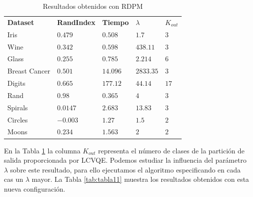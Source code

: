 \begin{table}[!h]
	\centering
	\setlength{\arrayrulewidth}{1mm}
	\setlength{\tabcolsep}{10pt}
	\renewcommand{\arraystretch}{0.85}
	
	\begin{tabular}{ >{\centering\arraybackslash}m{2.5cm}  >{\centering\arraybackslash}m{1.8cm}>{\centering\arraybackslash}m{1.5cm}>{\centering\arraybackslash}m{1cm}>{\centering\arraybackslash}m{1cm}}
		\hline
		\rowcolor{black}
		\multicolumn{5}{c}{\bf \color{white}{Resultados obtenidos con RDPM}}\\
		\hline
		\rowcolor{gray!50}
		\textbf{Dataset} & \textbf{RandIndex} & \textbf{Tiempo} & \textbf{$\lambda$} & \textbf{$K_{out}$}  \\
		Iris & $0.479$ & $0.508$ & $1.7$ & $3$ \\
		Wine & $0.342$ & $0.598$ & $438.11$ & $3$ \\
		Glass & $0.255$ & $0.785$ & $2.214$ & $6$ \\
		Breast Cancer & $0.501$ & $14.096$ & $2833.35$ & $3$ \\
		Digits & $0.665$ & $177.12$ & $44.14$ & $17$ \\
		Rand & $0.98$ & $0.365$ & $4$ & $3$ \\
		Spirals & $0.0147$ & $2.683$ & $13.83$ & $3$ \\
		Circles & $-0.003$ & $1.27$ & $1.5$ & $2$  \\
		Moons & $0.234$ & $1.563$ & $2$ & $2$ \\
		\hline
		
	\end{tabular}
	\caption{Resultados obtenidos con \acs{RDPM}}
	\label{tab:tabla10}
\end{table}

En la Tabla \ref{tab:tabla10} la columna $K_{out}$ representa el número de clases de la partición de salida proporcionada por \acs{LCVQE}. Podemos estudiar la influencia del parámetro $\lambda$ sobre este resultado, para ello ejecutamos el algoritmo especificando en cada cas un $\lambda$ mayor. La Tabla \ref{tab:tabla11} muestra los resultados obtenidos con esta nueva configuración.

